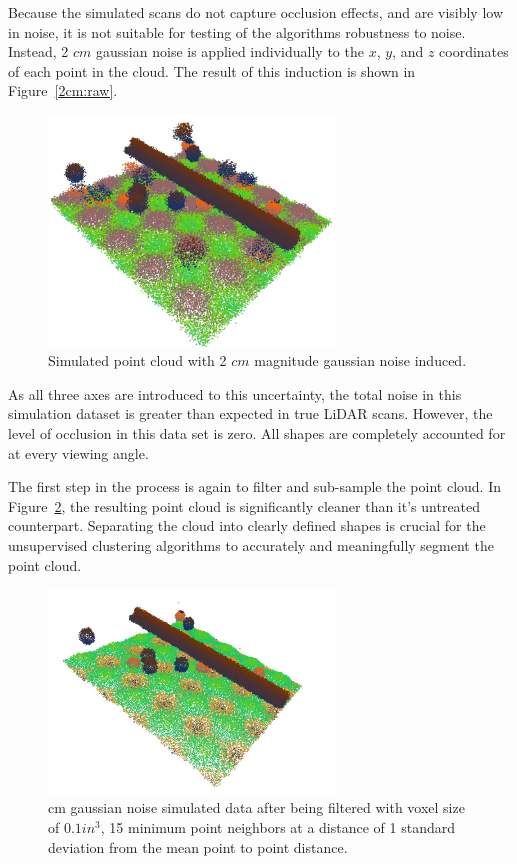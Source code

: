 \documentclass[12pt]{drexelthesis}
\begin{document}
Because the simulated scans do not capture occlusion effects, and are visibly low in noise, it is not suitable for testing of the algorithms robustness to noise. Instead, 2 $cm$ gaussian noise is applied individually to the $x$, $y$, and $z$ coordinates of each point in the cloud. The result of this induction is shown in Figure~\ref{2cm:raw}.

\begin{figure}[!ht] 
	\centering
		\includegraphics[width=3in]{simulated-lab-scan/2cmnoise/rawcloud.jpg}
		\caption[Simulated point cloud with 2cm magnitude gaussian noise induced]{\centering  Simulated point cloud with 2 $cm$ magnitude gaussian noise induced.}
\label{2cmnoise:raw}
\end{figure}

As all three axes are introduced to this uncertainty, the total noise in this simulation dataset is greater than expected in true LiDAR scans. However, the level of occlusion in this data set is zero. All shapes are completely accounted for at every viewing angle.

The first step in the process is again to filter and sub-sample the point cloud. In Figure~\ref{2cmnoise:filtered}, the resulting point cloud is significantly cleaner than it's untreated counterpart. Separating the cloud into clearly defined shapes is crucial for the unsupervised clustering algorithms to accurately and meaningfully segment the point cloud. 

\begin{figure}[!ht]
	
	\centering
		\includegraphics[width=3in]{simulated-lab-scan/2cmnoise/DS01k15std1.jpg}
		\caption[2 cm gaussian noise simulated data after being filtered with voxel size of 0.1 $in^{3}$, 15 minimum point neighbors at a distance of 1 standard deviation from the mean point to point distance]{ cm gaussian noise simulated data after being filtered with voxel size of $0.1 in^{3}$, 15 minimum point neighbors at a distance of 1 standard deviation from the mean point to point distance.}
\label{2cmnoise:filtered}
\end{figure}
\end{document}
